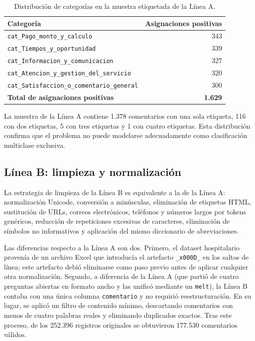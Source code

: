 \documentclass[12pt,a4paper]{article}
\newcommand{\code}[1]{\nolinkurl{#1}}
\begin{document}
\begin{table}[htbp]
\centering
\caption{Distribución de categorías en la muestra etiquetada de la Línea A.}
\label{tab:categorias_a}
\small
\begin{tabularx}{\textwidth}{@{}Y r@{}}
\toprule
\textbf{Categoría} & \textbf{Asignaciones positivas} \\
\midrule
\code{cat\_Pago\_monto\_y\_calculo} & 343 \\
\code{cat\_Tiempos\_y\_oportunidad} & 339 \\
\code{cat\_Informacion\_y\_comunicacion} & 327 \\
\code{cat\_Atencion\_y\_gestion\_del\_servicio} & 320 \\
\code{cat\_Satisfaccion\_o\_comentario\_general} & 300 \\
\midrule
\textbf{Total de asignaciones positivas} & \textbf{1.629} \\
\bottomrule
\end{tabularx}
\end{table}
\FloatBarrier

La muestra de la Línea A contiene 1.378 comentarios con una sola etiqueta, 116 con dos etiquetas, 5 con tres etiquetas y 1 con cuatro etiquetas. Esta distribución confirma que el problema no puede modelarse adecuadamente como clasificación multiclase exclusiva.

\subsection{Línea B: limpieza y normalización}

La estrategia de limpieza de la Línea B es equivalente a la de la Línea A: normalización Unicode, conversión a minúsculas, eliminación de etiquetas HTML, sustitución de URLs, correos electrónicos, teléfonos y números largos por tokens genéricos, reducción de repeticiones excesivas de caracteres, eliminación de símbolos no informativos y aplicación del mismo diccionario de abreviaciones.

Las diferencias respecto a la Línea A son dos. Primero, el dataset hospitalario provenía de un archivo Excel que introducía el artefacto \code{\_x000D\_} en los saltos de línea; este artefacto debió eliminarse como paso previo antes de aplicar cualquier otra normalización. Segundo, a diferencia de la Línea A (que partió de cuatro preguntas abiertas en formato ancho y las unificó mediante un \code{melt}), la Línea B contaba con una única columna \code{comentario} y no requirió reestructuración. En su lugar, se aplicó un filtro de contenido mínimo, descartando comentarios con menos de cuatro palabras reales y eliminando duplicados exactos. Tras este proceso, de los 252.396 registros originales se obtuvieron 177.530 comentarios válidos.
\end{document}
